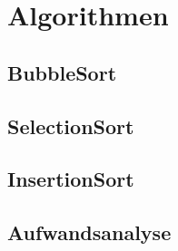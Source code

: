 \documentclass[./entry.tex]{subfiles}
\begin{document}
    \section{Algorithmen}
    \subsection{BubbleSort}
    
    \subsection{SelectionSort}
    
    \subsection{InsertionSort}
    
    \subsection{Aufwandsanalyse}
    
\end{document}
